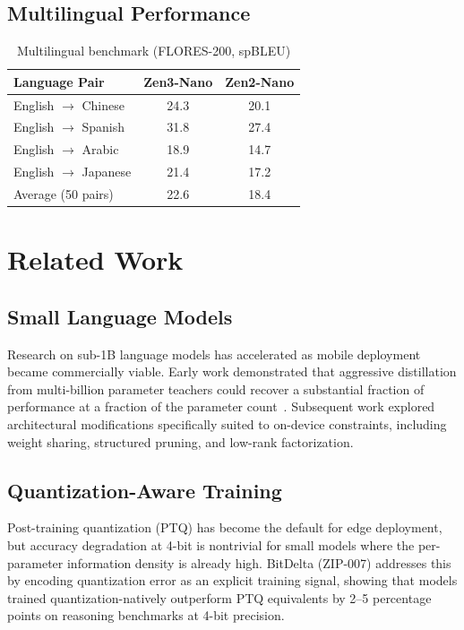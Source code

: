 \documentclass[11pt,a4paper]{article}
\begin{document}
\subsection{Multilingual Performance}

\begin{table}[H]
\centering
\caption{Multilingual benchmark (FLORES-200, spBLEU)}
\begin{tabular}{lcc}
\toprule
\textbf{Language Pair} & \textbf{Zen3-Nano} & \textbf{Zen2-Nano} \\
\midrule
English $\to$ Chinese   & 24.3 & 20.1 \\
English $\to$ Spanish   & 31.8 & 27.4 \\
English $\to$ Arabic    & 18.9 & 14.7 \\
English $\to$ Japanese  & 21.4 & 17.2 \\
Average (50 pairs)      & 22.6 & 18.4 \\
\bottomrule
\end{tabular}
\label{tab:multilingual}
\end{table}

\section{Related Work}
\label{sec:related}

\subsection{Small Language Models}

Research on sub-1B language models has accelerated as mobile deployment became
commercially viable. Early work demonstrated that aggressive distillation from
multi-billion parameter teachers could recover a substantial fraction of performance
at a fraction of the parameter count~\cite{hinton2015distilling}. Subsequent work
explored architectural modifications specifically suited to on-device constraints,
including weight sharing, structured pruning, and low-rank factorization.

\subsection{Quantization-Aware Training}

Post-training quantization (PTQ) has become the default for edge deployment, but
accuracy degradation at 4-bit is nontrivial for small models where the per-parameter
information density is already high. BitDelta (ZIP-007) addresses this by encoding
quantization error as an explicit training signal, showing that models trained
quantization-natively outperform PTQ equivalents by 2--5 percentage points on
reasoning benchmarks at 4-bit precision.
\end{document}
